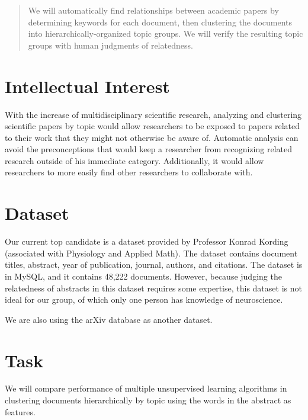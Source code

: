 \documentclass{acm_proc_article-sp}
\begin{document}
\date{16 November 2012}

\maketitle
\begin{abstract}
	We will automatically find relationships between academic papers by determining keywords for each document, then clustering the documents into hierarchically-organized topic groups. We will verify the resulting topic groups with human judgments of relatedness.
\end{abstract}


\section{Intellectual Interest}
With the increase of  multidisciplinary scientific research, analyzing and clustering scientific papers by topic would allow researchers to be exposed to papers related to their work that they might not otherwise be aware of. Automatic analysis can avoid the preconceptions that would keep a researcher from recognizing related research outside of his immediate category. Additionally, it would allow researchers to more easily find other researchers to collaborate with.

\section{Dataset}
Our current top candidate is a dataset provided by Professor Konrad Kording (associated with Physiology and Applied Math). The dataset contains document titles, abstract, year of publication, journal, authors, and citations. The dataset is in MySQL, and it contains 48,222 documents. However, because judging the relatedness of abstracts in this dataset requires some expertise, this dataset is not ideal for our group, of which only one person has knowledge of neuroscience.

We are also using the arXiv database as another dataset.

\section{Task}
We will compare performance of multiple unsupervised learning algorithms in clustering documents hierarchically by topic using the words in the abstract as features.
\end{document}
